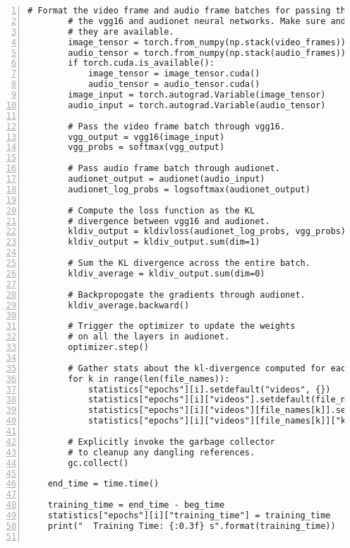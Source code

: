 {\begin{Verbatim}[frame=leftline, numbers=left, xleftmargin=5mm]
        # Format the video frame and audio frame batches for passing through
        # the vgg16 and audionet neural networks. Make sure and use GPUs if
        # they are available.
        image_tensor = torch.from_numpy(np.stack(video_frames)).float()
        audio_tensor = torch.from_numpy(np.stack(audio_frames)).float()
        if torch.cuda.is_available():
            image_tensor = image_tensor.cuda()
            audio_tensor = audio_tensor.cuda()
        image_input = torch.autograd.Variable(image_tensor)
        audio_input = torch.autograd.Variable(audio_tensor)

        # Pass the video frame batch through vgg16.
        vgg_output = vgg16(image_input)
        vgg_probs = softmax(vgg_output)

        # Pass audio frame batch through audionet.
        audionet_output = audionet(audio_input)
        audionet_log_probs = logsoftmax(audionet_output)

        # Compute the loss function as the KL
        # divergence between vgg16 and audionet.
        kldiv_output = kldivloss(audionet_log_probs, vgg_probs)
        kldiv_output = kldiv_output.sum(dim=1)

        # Sum the KL divergence across the entire batch.
        kldiv_average = kldiv_output.sum(dim=0)

        # Backpropogate the gradients through audionet.
        kldiv_average.backward()

        # Trigger the optimizer to update the weights
        # on all the layers in audionet.
        optimizer.step()

        # Gather stats about the kl-divergence computed for each video frame.
        for k in range(len(file_names)):
            statistics["epochs"][i].setdefault("videos", {})
            statistics["epochs"][i]["videos"].setdefault(file_names[k], {})
            statistics["epochs"][i]["videos"][file_names[k]].setdefault("kldiv_per_frame", [])
            statistics["epochs"][i]["videos"][file_names[k]]["kldiv_per_frame"].append(float(kldiv_output[k]))

        # Explicitly invoke the garbage collector
        # to cleanup any dangling references.
        gc.collect()

    end_time = time.time()

    training_time = end_time - beg_time
    statistics["epochs"][i]["training_time"] = training_time
    print("  Training Time: {:0.3f} s".format(training_time))


\end{Verbatim}}
